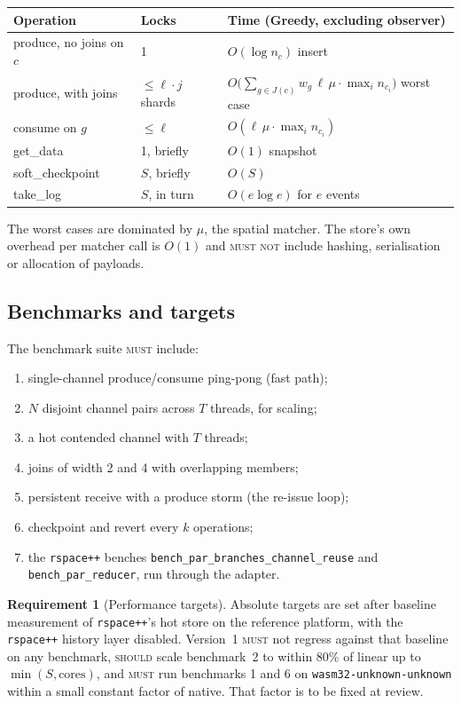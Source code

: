 \documentclass[11pt]{article}
\theoremstyle{plain}
\theoremstyle{definition}
\newtheorem{requirement}{Requirement}
\newcommand{\MUST}{\textsc{must}}
\newcommand{\MUSTNOT}{\textsc{must not}}
\newcommand{\SHOULD}{\textsc{should}}
\newcommand{\code}[1]{\texttt{#1}}
\begin{document}
\begin{center}
\begin{tabular}{@{}lll@{}}
\toprule
Operation & Locks & Time (Greedy, excluding observer)\\
\midrule
produce, no joins on $c$ & 1 & $O(\log n_c)$ insert\\
produce, with joins & $\le\ell\cdot j$ shards & $O\big(\sum_{g\in J(c)} w_g\,\ell\,\mu\cdot\max_i n_{c_i}\big)$ worst case\\
consume on $g$ & $\le\ell$ & $O(\ell\,\mu\cdot\max_i n_{c_i})$\\
get\_data & 1, briefly & $O(1)$ snapshot\\
soft\_checkpoint & $S$, briefly & $O(S)$\\
take\_log & $S$, in turn & $O(e\log e)$ for $e$ events\\
\bottomrule
\end{tabular}
\end{center}

The worst cases are dominated by $\mu$, the spatial matcher. The store's own overhead
per matcher call is $O(1)$ and \MUSTNOT{} include hashing, serialisation or
allocation of payloads.

\subsection{Benchmarks and targets}

The benchmark suite \MUST{} include:
\begin{enumerate}[nosep]
\item single-channel produce/consume ping-pong (fast path);
\item $N$ disjoint channel pairs across $T$ threads, for scaling;
\item a hot contended channel with $T$ threads;
\item joins of width 2 and 4 with overlapping members;
\item persistent receive with a produce storm (the re-issue loop);
\item checkpoint and revert every $k$ operations;
\item the \code{rspace++} benches \code{bench\_par\_branches\_channel\_reuse} and
      \code{bench\_par\_reducer}, run through the adapter.
\end{enumerate}

\begin{requirement}[Performance targets]
Absolute targets are set after baseline measurement of \code{rspace++}'s hot store on
the reference platform, with the \code{rspace++} history layer disabled. Version~1
\MUST{} not regress against that baseline on any benchmark, \SHOULD{} scale benchmark~2
to within 80\% of linear up to $\min(S,\text{cores})$, and \MUST{} run benchmarks 1 and 6
on \code{wasm32-unknown-unknown} within a small constant factor of native. That factor
is to be fixed at review.
\end{requirement}
\end{document}
